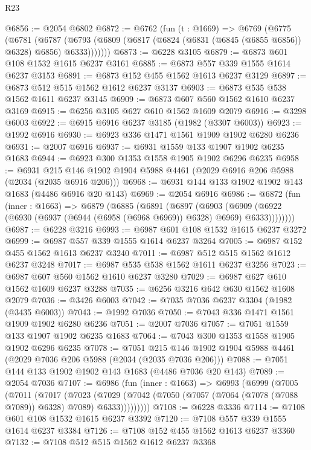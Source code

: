 \begin{lexlean}{R23}
\begin{coremodule}
@6856 := @2054 @6802
@6872 := @6762
    (fun (t : @1669) =>
    @6769
      (@6775
        (@6781
          (@6787 (@6793 (@6809 (@6817 (@6824 (@6831 (@6845 (@6855 @6856)) @6328) @6856) @6333)))))))
@6873 := @6228 @3105
@6879 := @6873 @601 @108 @1532 @1615 @6237 @3161
@6885 := @6873 @557 @339 @1555 @1614 @6237 @3153
@6891 := @6873 @152 @455 @1562 @1613 @6237 @3129
@6897 := @6873 @512 @515 @1562 @1612 @6237 @3137
@6903 := @6873 @535 @538 @1562 @1611 @6237 @3145
@6909 := @6873 @607 @560 @1562 @1610 @6237 @3169
@6915 := @6256 @3105 @627 @610 @1562 @1609 @2079
@6916 := @3298 @6003
@6922 := @6915 @6916 @6237 @3185 (@1982 (@3307 @6003))
@6923 := @1992 @6916
@6930 := @6923 @336 @1471 @1561 @1909 @1902 @6280 @6236
@6931 := @2007 @6916
@6937 := @6931 @1559 @133 @1907 @1902 @6235 @1683
@6944 := @6923 @300 @1353 @1558 @1905 @1902 @6296 @6235
@6958 := @6931 @215 @146 @1902 @1904 @5988 @4461 (@2029 @6916 @206 @5988 (@2034 (@2035 @6916 @206)))
@6968 := @6931 @144 @133 @1902 @1902 @143 @1683 (@4486 @6916 @20 @143)
@6969 := @2054 @6916
@6986 := @6872
    (fun (inner : @1663) =>
    @6879
      (@6885
        (@6891
          (@6897
            (@6903
              (@6909 (@6922 (@6930 (@6937 (@6944 (@6958 (@6968 @6969)) @6328) @6969) @6333))))))))
@6987 := @6228 @3216
@6993 := @6987 @601 @108 @1532 @1615 @6237 @3272
@6999 := @6987 @557 @339 @1555 @1614 @6237 @3264
@7005 := @6987 @152 @455 @1562 @1613 @6237 @3240
@7011 := @6987 @512 @515 @1562 @1612 @6237 @3248
@7017 := @6987 @535 @538 @1562 @1611 @6237 @3256
@7023 := @6987 @607 @560 @1562 @1610 @6237 @3280
@7029 := @6987 @627 @610 @1562 @1609 @6237 @3288
@7035 := @6256 @3216 @642 @630 @1562 @1608 @2079
@7036 := @3426 @6003
@7042 := @7035 @7036 @6237 @3304 (@1982 (@3435 @6003))
@7043 := @1992 @7036
@7050 := @7043 @336 @1471 @1561 @1909 @1902 @6280 @6236
@7051 := @2007 @7036
@7057 := @7051 @1559 @133 @1907 @1902 @6235 @1683
@7064 := @7043 @300 @1353 @1558 @1905 @1902 @6296 @6235
@7078 := @7051 @215 @146 @1902 @1904 @5988 @4461 (@2029 @7036 @206 @5988 (@2034 (@2035 @7036 @206)))
@7088 := @7051 @144 @133 @1902 @1902 @143 @1683 (@4486 @7036 @20 @143)
@7089 := @2054 @7036
@7107 := @6986
    (fun (inner : @1663) =>
    @6993
      (@6999
        (@7005
          (@7011
            (@7017
              (@7023
                (@7029
                  (@7042 (@7050 (@7057 (@7064 (@7078 (@7088 @7089)) @6328) @7089) @6333)))))))))
@7108 := @6228 @3336
@7114 := @7108 @601 @108 @1532 @1615 @6237 @3392
@7120 := @7108 @557 @339 @1555 @1614 @6237 @3384
@7126 := @7108 @152 @455 @1562 @1613 @6237 @3360
@7132 := @7108 @512 @515 @1562 @1612 @6237 @3368

\end{coremodule}
\end{lexlean}

